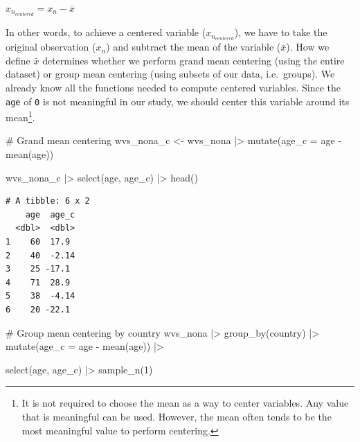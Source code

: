 \documentclass[
  letterpaper,
]{krantz}
\makeatletter
\newenvironment{Shaded}{\begin{snugshade}}{\end{snugshade}}
\newcommand{\AttributeTok}[1]{\textcolor[rgb]{0.40,0.45,0.13}{#1}}
\newcommand{\CommentTok}[1]{\textcolor[rgb]{0.37,0.37,0.37}{#1}}
\newcommand{\DecValTok}[1]{\textcolor[rgb]{0.68,0.00,0.00}{#1}}
\newcommand{\FunctionTok}[1]{\textcolor[rgb]{0.28,0.35,0.67}{#1}}
\newcommand{\NormalTok}[1]{\textcolor[rgb]{0.00,0.23,0.31}{#1}}
\newcommand{\OtherTok}[1]{\textcolor[rgb]{0.00,0.23,0.31}{#1}}
\newcommand{\SpecialCharTok}[1]{\textcolor[rgb]{0.37,0.37,0.37}{#1}}
\newenvironment{kframe}{%
\medskip{}
\setlength{\fboxsep}{.8em}
 \def\at@end@of@kframe{}%
 \ifinner\ifhmode%
  \def\at@end@of@kframe{\end{minipage}}%
  \begin{minipage}{\columnwidth}%
 \fi\fi%
 \def\FrameCommand##1{\hskip\@totalleftmargin \hskip-\fboxsep
 \colorbox{shadecolor}{##1}\hskip-\fboxsep
     \hskip-\linewidth \hskip-\@totalleftmargin \hskip\columnwidth}%
 \MakeFramed {\advance\hsize-\width
   \@totalleftmargin\z@ \linewidth\hsize
   \@setminipage}}%
 {\par\unskip\endMakeFramed%
 \at@end@of@kframe}
\renewenvironment{Shaded}{\begin{kframe}}{\end{kframe}}
\makeatother
\begin{document}
\label{centering-formula}
\(x_{n_{centered}} = x_n - \overline{x}\)

In other words, to achieve a centered variable (\(x_{n_{centered}}\)),
we have to take the original observation (\(x_n\)) and subtract the mean
of the variable (\(\bar{x}\)). How we define \(\bar{x}\) determines
whether we perform grand mean centering (using the entire dataset) or
group mean centering (using subsets of our data, i.e.~groups). We
already know all the functions needed to compute centered variables.
Since the \texttt{age} of \texttt{0} is not meaningful in our study, we
should center this variable around its mean\footnote{It is not required
  to choose the mean as a way to center variables. Any value that is
  meaningful can be used. However, the mean often tends to be the most
  meaningful value to perform centering.}.

\begin{Shaded}
\begin{Highlighting}[]
\CommentTok{\# Grand mean centering}
\NormalTok{wvs\_nona\_c }\OtherTok{\textless{}{-}}
\NormalTok{  wvs\_nona }\SpecialCharTok{|\textgreater{}}
  \FunctionTok{mutate}\NormalTok{(}\AttributeTok{age\_c =}\NormalTok{ age }\SpecialCharTok{{-}} \FunctionTok{mean}\NormalTok{(age))}

\NormalTok{wvs\_nona\_c }\SpecialCharTok{|\textgreater{}}
  \FunctionTok{select}\NormalTok{(age, age\_c) }\SpecialCharTok{|\textgreater{}}
  \FunctionTok{head}\NormalTok{()}
\end{Highlighting}
\end{Shaded}

\begin{verbatim}
# A tibble: 6 x 2
    age  age_c
  <dbl>  <dbl>
1    60  17.9 
2    40  -2.14
3    25 -17.1 
4    71  28.9 
5    38  -4.14
6    20 -22.1 
\end{verbatim}

\begin{Shaded}
\begin{Highlighting}[]
\CommentTok{\# Group mean centering by country}
\NormalTok{wvs\_nona }\SpecialCharTok{|\textgreater{}}
  \FunctionTok{group\_by}\NormalTok{(country) }\SpecialCharTok{|\textgreater{}}
  \FunctionTok{mutate}\NormalTok{(}\AttributeTok{age\_c =}\NormalTok{ age }\SpecialCharTok{{-}} \FunctionTok{mean}\NormalTok{(age)) }\SpecialCharTok{|\textgreater{}}
  
  \FunctionTok{select}\NormalTok{(age, age\_c) }\SpecialCharTok{|\textgreater{}}
  \FunctionTok{sample\_n}\NormalTok{(}\DecValTok{1}\NormalTok{)}
\end{Highlighting}
\end{Shaded}
\end{document}
